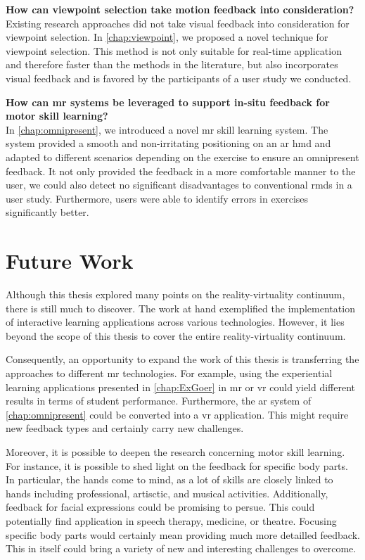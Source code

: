 \textbf{How can viewpoint selection take motion feedback into consideration?}\\
Existing research approaches did not take visual feedback into consideration for viewpoint selection.
In \autoref{chap:viewpoint}, we proposed a novel technique for viewpoint selection.
This method is not only suitable for real-time application and therefore faster than the methods in the literature, but also incorporates visual feedback and is favored by the participants of a user study we conducted.

\textbf{How can \acrlong{mr} systems be leveraged to support in-situ feedback for motor skill learning?}\\
In \autoref{chap:omnipresent}, we introduced a novel \acrshort{mr} skill learning system.
The system provided a smooth and non-irritating positioning on an \acrshort{ar} \acrshort{hmd} and adapted to different scenarios depending on the exercise to ensure an omnipresent feedback.
It not only provided the feedback in a more comfortable manner to the user, we could also detect no significant disadvantages to conventional \acrshort{rmd}s in a user study.
Furthermore, users were able to identify errors in exercises significantly better.

\section{Future Work}
\label{sec:conclusion:future}

Although this thesis explored many points on the reality-virtuality continuum, there is still much to discover.
The work at hand exemplified the implementation of interactive learning applications across various technologies.
However, it lies beyond the scope of this thesis to cover the entire reality-virtuality continuum.

Consequently, an opportunity to expand the work of this thesis is transferring the approaches to different \acrshort{mr} technologies.
For example, using the experiential learning applications presented in \autoref{chap:ExGoer} in \acrshort{mr} or \acrshort{vr} could yield different results in terms of student performance.
Furthermore, the \acrshort{ar} system of \autoref{chap:omnipresent} could be converted into a \acrshort{vr} application.
This might require new feedback types and certainly carry new challenges.

Moreover, it is possible to deepen the research concerning motor skill learning.
For instance, it is possible to shed light on the feedback for specific body parts.
In particular, the hands come to mind, as a lot of skills are closely linked to hands including professional, artisctic, and musical activities.
Additionally, feedback for facial expressions could be promising to persue.
This could potentially find application in speech therapy, medicine, or theatre.
Focusing specific body parts would certainly mean providing much more detailled feedback.
This in itself could bring a variety of new and interesting challenges to overcome.

